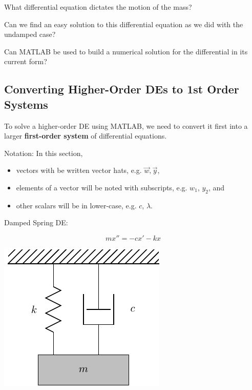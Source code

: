\problem What differential equation dictates the motion of the mass?

\vspace{1in}

Can we find an easy solution to this differential equation as we did with the undamped
case?
\vfill


Can MATLAB be used to build a numerical solution for the differential
in its current form?

\vfill

\newpage


\subsection*{Converting Higher-Order DEs to 1st Order Systems}
To solve a higher-order DE using MATLAB, we need to convert it first
into a larger {\bf first-order system} of differential equations.


\vspace{0.3in}
Notation: In this section, 
\begin{itemize} 
\item vectors with be written vector hats, e.g. $\vec{w}, \vec{y}$,
\item elements of a vector will be noted with subscripts, e.g. $w_1$,
  $y_2$, and
\item other scalars will be in lower-case, e.g. $c$, $\lambda$.
\end{itemize}

\newpage

\begin{minipage}[t]{0.4\linewidth}
\vspace{0pt}
Damped Spring DE:

$$ m x'' = -c x' -kx $$
\end{minipage}
\begin{minipage}[t]{0.6\linewidth}
\vspace{0pt}
\begin{center}
\includegraphics[width=0.5\linewidth]{graphics/notes_08_hanging_mass}
\end{center}
\end{minipage}

